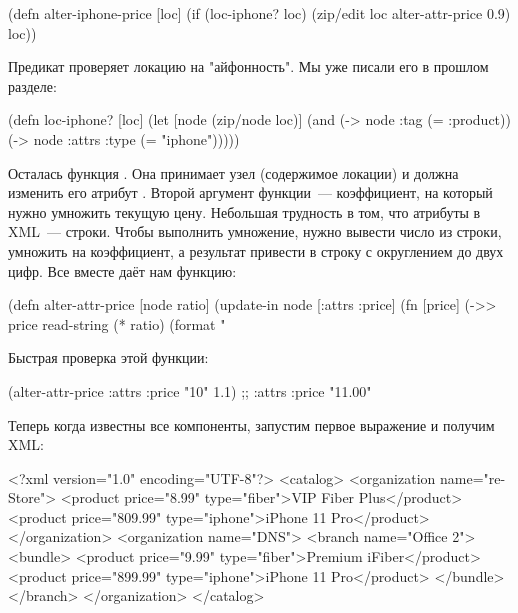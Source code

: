 \begin{english}
  \begin{clojure}
(defn alter-iphone-price [loc]
  (if (loc-iphone? loc)
    (zip/edit loc alter-attr-price 0.9)
    loc))
  \end{clojure}
\end{english}

Предикат  проверяет локацию на "айфонность". Мы уже писали его в
прошлом разделе:

\begin{english}
  \begin{clojure}
(defn loc-iphone? [loc]
  (let [node (zip/node loc)]
    (and (-> node :tag (= :product))
         (-> node :attrs :type (= "iphone")))))
  \end{clojure}
\end{english}

Осталась функция . Она принимает узел (содержимое локации) и
должна изменить его атрибут . Второй аргумент функции~--- коэффициент, на
который нужно умножить текущую цену. Небольшая трудность в том, что атрибуты в
XML~--- строки. Чтобы выполнить умножение, нужно вывести число из строки, умножить
на коэффициент, а результат привести в строку с округлением до двух цифр. Все
вместе даёт нам функцию:

\begin{english}
  \begin{clojure}
(defn alter-attr-price [node ratio]
  (update-in node [:attrs :price]
             (fn [price]
               (->> price
                    read-string
                    (* ratio)
                    (format "%
  \end{clojure}
\end{english}

Быстрая проверка этой функции:

\begin{english}
  \begin{clojure}
(alter-attr-price {:attrs {:price "10"}} 1.1)
;; {:attrs {:price "11.00"}}
  \end{clojure}
\end{english}

Теперь когда известны все компоненты, запустим первое выражение и получим XML:

\begin{english}
  \begin{xml}
<?xml version="1.0" encoding="UTF-8"?>
<catalog>
  <organization name="re-Store">
    <product price="8.99" type="fiber">VIP Fiber Plus</product>
    <product price="809.99" type="iphone">iPhone 11 Pro</product>
  </organization>
  <organization name="DNS">
    <branch name="Office 2">
      <bundle>
        <product price="9.99" type="fiber">Premium iFiber</product>
        <product price="899.99" type="iphone">iPhone 11 Pro</product>
      </bundle>
    </branch>
  </organization>
</catalog>
  \end{xml}
\end{english}

